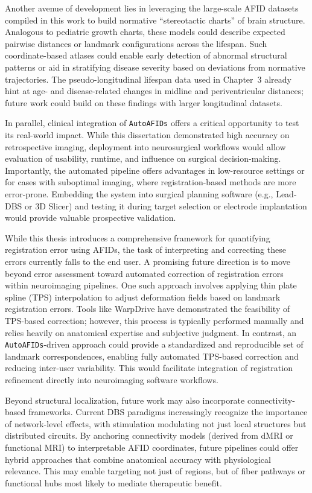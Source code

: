 Another avenue of development lies in leveraging the large-scale AFID datasets compiled in this work to build normative “stereotactic charts” of brain structure. Analogous to pediatric growth charts, these models could describe expected pairwise distances or landmark configurations across the lifespan. Such coordinate-based atlases could enable early detection of abnormal structural patterns or aid in stratifying disease severity based on deviations from normative trajectories. The pseudo-longitudinal lifespan data used in Chapter~3 already hint at age- and disease-related changes in midline and periventricular distances; future work could build on these findings with larger longitudinal datasets.

In parallel, clinical integration of \texttt{AutoAFIDs} offers a critical opportunity to test its real-world impact. While this dissertation demonstrated high accuracy on retrospective imaging, deployment into neurosurgical workflows would allow evaluation of usability, runtime, and influence on surgical decision-making. Importantly, the automated pipeline offers advantages in low-resource settings or for cases with suboptimal imaging, where registration-based methods are more error-prone. Embedding the system into surgical planning software (e.g., Lead-DBS or 3D Slicer) and testing it during target selection or electrode implantation would provide valuable prospective validation.

While this thesis introduces a comprehensive framework for quantifying registration error using AFIDs, the task of interpreting and correcting these errors currently falls to the end user. A promising future direction is to move beyond error assessment toward automated correction of registration errors within neuroimaging pipelines. One such approach involves applying thin plate spline (TPS) interpolation to adjust deformation fields based on landmark registration errors. Tools like WarpDrive \cite{Oxenford2024-ah} have demonstrated the feasibility of TPS-based correction; however, this process is typically performed manually and relies heavily on anatomical expertise and subjective judgment. In contrast, an \texttt{AutoAFIDs}-driven approach could provide a standardized and reproducible set of landmark correspondences, enabling fully automated TPS-based correction and reducing inter-user variability. This would facilitate integration of registration refinement directly into neuroimaging software workflows.

Beyond structural localization, future work may also incorporate connectivity-based frameworks. Current DBS paradigms increasingly recognize the importance of network-level effects, with stimulation modulating not just local structures but distributed circuits. By anchoring connectivity models (derived from dMRI or functional MRI) to interpretable AFID coordinates, future pipelines could offer hybrid approaches that combine anatomical accuracy with physiological relevance. This may enable targeting not just of regions, but of fiber pathways or functional hubs most likely to mediate therapeutic benefit.

